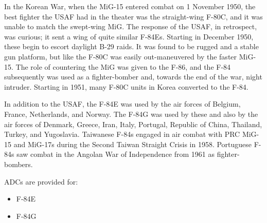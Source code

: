 In the Korean War, when the MiG-15 entered combat on 1 November 1950, the best fighter the USAF had in the theater was the straight-wing F-80C, and it was unable to match the swept-wing MiG. The response of the USAF, in retrospect, was curious; it sent a wing of quite similar F-84Es. Starting in December 1950, these begin to escort daylight B-29 raids. It was found to be rugged and a stable gun platform, but like the F-80C was easily out-maneuvered by the faster MiG-15. The role of countering the MiG was given to the F-86, and the F-84 subsequently was used as a fighter-bomber and, towards the end of the war, night intruder. Starting in 1951, many F-80C units in Korea converted to the F-84.

In addition to the USAF, the F-84E was used by the air forces of Belgium, France, Netherlands, and Norway. The F-84G was used by these and also by the air forces of Denmark, Greece, Iran, Italy, Portugal, Republic of China, Thailand, Turkey, and Yugoslavia. Taiwanese F-84s engaged in air combat with PRC MiG-15 and MiG-17s during the Second Taiwan Straight Crisis in 1958. Portuguese F-84s saw combat in the Angolan War of Independence from 1961 as fighter-bombers.

ADCs are provided for:
\begin{itemize}
    \item F-84E
    \item F-84G
\end{itemize}